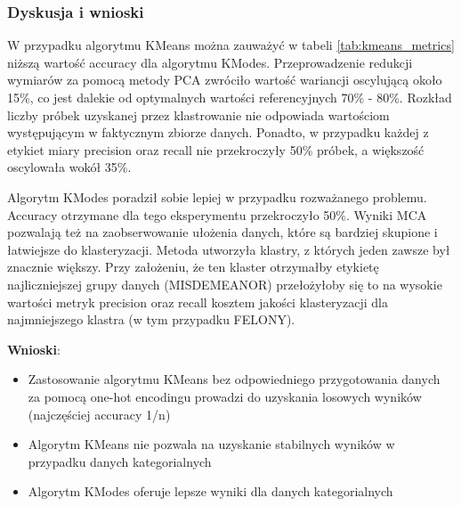\documentclass{classrep}
\begin{document}
{{            \subsubsection{Dyskusja i wnioski} {
                 W przypadku algorytmu KMeans można zauważyć w tabeli \ref{tab:kmeans_metrics} niższą wartość accuracy dla algorytmu KModes. Przeprowadzenie redukcji wymiarów za pomocą metody PCA zwróciło wartość wariancji oscylującą około 15\%, co jest dalekie od optymalnych wartości referencyjnych 70\% - 80\%. Rozkład liczby próbek uzyskanej przez klastrowanie nie odpowiada wartościom występującym w faktycznym zbiorze danych. Ponadto, w przypadku każdej z etykiet miary precision oraz recall nie przekroczyły 50\% próbek, a większość oscylowała wokół 35\%.
                 
                 Algorytm KModes poradził sobie lepiej w przypadku rozważanego problemu. Accuracy otrzymane dla tego eksperymentu przekroczyło 50\%. Wyniki MCA pozwalają też na zaobserwowanie ułożenia danych, które są bardziej skupione i łatwiejsze do klasteryzacji. Metoda utworzyła klastry, z których jeden zawsze był znacznie większy. Przy założeniu, że ten klaster otrzymałby etykietę najliczniejszej grupy danych (MISDEMEANOR) przełożyłoby się to na wysokie wartości metryk precision oraz recall kosztem jakości klasteryzacji dla najmniejszego klastra (w tym przypadku FELONY).
                 
                 \textbf{Wnioski}:
                 \begin{itemize}
                     \item Zastosowanie algorytmu KMeans bez odpowiedniego przygotowania danych za pomocą one-hot encodingu prowadzi do uzyskania losowych wyników (najczęściej accuracy 1/n)
                     \item Algorytm KMeans nie pozwala na uzyskanie stabilnych wyników w przypadku danych kategorialnych
                     \item Algorytm KModes oferuje lepsze wyniki dla danych kategorialnych
                 \end{itemize}
            }
        }
        \newpage
    }
    
\end{document}
